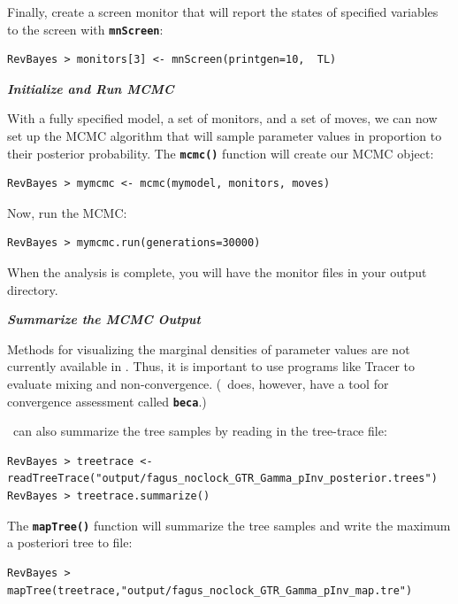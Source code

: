 \documentclass[11pt]{article}
\newcommand{\cl}[1]{{\texttt{\textbf{#1}}}}
\begin{document}
Finally, create a screen monitor that will report the states of specified variables to the screen with \cl{mnScreen}:
{\tt \begin{snugshade*}
\begin{lstlisting}
RevBayes > monitors[3] <- mnScreen(printgen=10,  TL)
\end{lstlisting}
\end{snugshade*}}

\textbf{\textit{Initialize and Run MCMC}}

With a fully specified model, a set of monitors, and a set of moves, we can now set up the MCMC algorithm that will sample parameter values in proportion to their posterior probability. The \cl{mcmc()} function will create our MCMC object:
{\tt \begin{snugshade*}
\begin{lstlisting}
RevBayes > mymcmc <- mcmc(mymodel, monitors, moves)
\end{lstlisting}
\end{snugshade*}}


Now, run the MCMC:
{\tt \begin{snugshade*}
\begin{lstlisting}
RevBayes > mymcmc.run(generations=30000)
\end{lstlisting}
\end{snugshade*}}

When the analysis is complete, you will have the monitor files in your output directory.


\textbf{\textit{Summarize the MCMC Output}}

Methods for visualizing the marginal densities of parameter values are not currently available in \RevBayes. Thus, it is important to use programs like Tracer \citep{rambaut09} to evaluate mixing and non-convergence. (\RevBayes~does, however, have a tool for convergence assessment called \cl{beca}.)

\RevBayes~can also summarize the tree samples by reading in the tree-trace file:
{\tt \begin{snugshade*}
\begin{lstlisting}
RevBayes > treetrace <- readTreeTrace("output/fagus_noclock_GTR_Gamma_pInv_posterior.trees")
RevBayes > treetrace.summarize()
\end{lstlisting}
\end{snugshade*}}


The \cl{mapTree()} function will summarize the tree samples and write the maximum a posteriori tree to file:
{\tt \begin{snugshade*}
\begin{lstlisting}
RevBayes > mapTree(treetrace,"output/fagus_noclock_GTR_Gamma_pInv_map.tre")
\end{lstlisting}
\end{snugshade*}}
\end{document}
